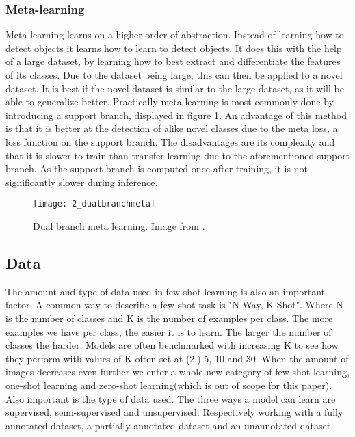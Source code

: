 \subsubsection*{Meta-learning}

Meta-learning learns on a higher order of abstraction. Instead of learning how to detect objects it learns how to learn to detect objects. It does this with the help of a large dataset, by learning how to best extract and differentiate the features of its classes. Due to the dataset being large, this can then be applied to a novel dataset. It is best if the novel dataset is similar to the large dataset, as it will be able to generalize better. Practically meta-learning is most commonly done by introducing a support branch\cite{few-shot-comprehensive-survey}, displayed in figure \ref{fig:2_dualbranchmeta}. An advantage of this method is that it is better at the detection of alike novel classes due to the meta loss, a loss function on the support branch. %
The disadvantages are its complexity and that it is slower to train than transfer learning due to the aforementioned support branch. As the support branch is computed once after training, it is not significantly slower during inference.

\begin{figure}[H]
	\centering
	\texttt{[image: 2\_dualbranchmeta]}
	\caption{\label{fig:2_dualbranchmeta} Dual branch meta learning. Image from \citet{few-shot-comprehensive-survey}.}
\end{figure}

\subsection{Data}

The amount and type of data used in few-shot learning is also an important factor. A common way to describe a few shot task is "N-Way, K-Shot". Where N is the number of classes and K is the number of examples per class. The more examples we have per class, the easier it is to learn. The larger the number of classes the harder. Models are often benchmarked with increasing K to see how they perform with values of K often set at (2,) 5, 10 and 30. When the amount of images decreases even further we enter a whole new category of few-shot learning, one-shot learning and zero-shot learning(which is out of scope for this paper). Also important is the type of data used. The three ways a model can learn are supervised, semi-supervised and unsupervised. Respectively working with a fully annotated dataset, a partially annotated dataset and an unannotated dataset.

